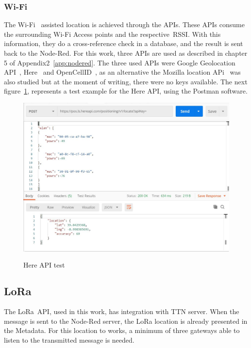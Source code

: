 \subsubsection{Wi-Fi} %
\label{sec:wifi_sota}
The Wi-Fi~\cite{wifi} assisted location is achieved through the APIs. These APIs consume the surrounding Wi-Fi Access points and the respective~\gls{RSSI}. With this information, they do a cross-reference check in a database, and the result is sent back to the Node-Red. For this work, three APIs are used as described in chapter 5 of Appendix2~\ref{app:nodered}. The three used APIs were Google Geolocation API~\cite{GoogleLocation}, Here~\cite{Here} and OpenCellID~\cite{OpenCell}, as an alternative the Mozilla location APi~\cite{Mozilla} was also studied but at the moment of writing, there were no keys available. The next figure~\ref{fig:Google_API}, represents a test example for the Here API, using the Postman software.\newline


 
  \begin{figure}[htbp]
  \centering
  
    {\includegraphics[width=\linewidth]{Chapters/Figures/herepost.JPG}}
 
  \caption{Here API test}
  \label{fig:Google_API}
\end{figure}








\newpage
\subsection{LoRa} %
\label{sec:lora_api_sota}
The LoRa~\gls{API}, used in this work, has  integration with TTN server. When the message is sent to the Node-Red server, the LoRa location is already presented in the Metadata. For this location to works, a minimum of three gateways able to listen to the transmitted message is needed.

